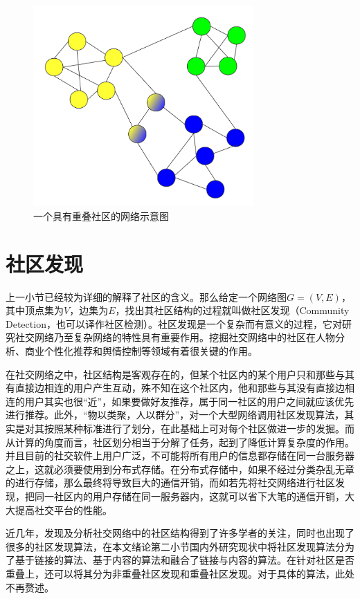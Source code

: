 \begin{figure}
  \centering
  \includegraphics[width=0.75\textwidth]{figures/fig2-4}
  \caption{一个具有重叠社区的网络示意图}\label{fig:fig2-4}
\end{figure}

\section{社区发现}

上一小节已经较为详细的解释了社区的含义。那么给定一个网络图$G=(V,E)$，其中顶点集为$V$，边集为$E$，找出其社区结构的过程就叫做社区发现（Community Detection，也可以译作社区检测）。社区发现是一个复杂而有意义的过程，它对研究社交网络乃至复杂网络的特性具有重要作用。挖掘社交网络中的社区在人物分析、商业个性化推荐和舆情控制等领域有着很关键的作用。
 
在社交网络之中，社区结构是客观存在的，但某个社区内的某个用户只和那些与其有直接边相连的用户产生互动，殊不知在这个社区内，他和那些与其没有直接边相连的用户其实也很“近”，如果要做好友推荐，属于同一社区的用户之间就应该优先进行推荐。此外，“物以类聚，人以群分”，对一个大型网络调用社区发现算法，其实是对其按照某种标准进行了划分，在此基础上可对每个社区做进一步的发掘。而从计算的角度而言，社区划分相当于分解了任务，起到了降低计算复杂度的作用。并且目前的社交软件上用户广泛，不可能将所有用户的信息都存储在同一台服务器之上，这就必须要使用到分布式存储。在分布式存储中，如果不经过分类杂乱无章的进行存储，那么最终将导致巨大的通信开销，而如若先将社交网络进行社区发现，把同一社区内的用户存储在同一服务器内，这就可以省下大笔的通信开销，大大提高社交平台的性能。

近几年，发现及分析社交网络中的社区结构得到了许多学者的关注，同时也出现了很多的社区发现算法，在本文绪论第二小节国内外研究现状中将社区发现算法分为了基于链接的算法、基于内容的算法和融合了链接与内容的算法。在针对社区是否重叠上，还可以将其分为非重叠社区发现和重叠社区发现。对于具体的算法，此处不再赘述。

